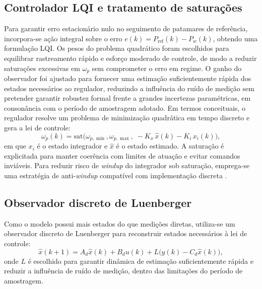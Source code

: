 \documentclass[a4paper]{ifacconf}
\begin{document}
\subsection{Controlador LQI e tratamento de saturações}
Para garantir erro estacionário nulo no seguimento de patamares de referência, incorpora-se ação integral sobre o erro $e(k)=P_{\mathrm{ref}}(k)-P_w(k)$, obtendo uma formulação LQI. Os pesos do problema quadrático foram escolhidos para equilibrar rastreamento rápido e esforço moderado de controle, de modo a reduzir saturações excessivas em $\omega_p$ sem comprometer o erro em regime. O ganho do observador foi ajustado para fornecer uma estimação suficientemente rápida dos estados necessários ao regulador, reduzindo a influência do ruído de medição sem pretender garantir robustez formal frente a grandes incertezas paramétricas, em consonância com o período de amostragem adotado. Em termos conceituais, o regulador resolve um problema de minimização quadrática em tempo discreto e gera a lei de controle:
\begin{equation}
   \omega_p(k) = \mathrm{sat}\big(\omega_{p,\min},\omega_{p,\max},\; -K_x\,\hat{x}(k)-K_i\,x_i(k)\big),
   \label{eq:lqi_control}
\end{equation}
em que $x_i$ é o estado integrador e $\hat{x}$ é o estado estimado. A saturação é explicitada para manter coerência com limites de atuação e evitar comandos inviáveis. Para reduzir risco de \textit{windup} do integrador sob saturação, emprega-se uma estratégia de anti-\textit{windup} compatível com implementação discreta \cite{FranklinPowellWorkman1998,Ogata1997}.

\subsection{Observador discreto de Luenberger}
Como o modelo possui mais estados do que medições diretas, utiliza-se um observador discreto de Luenberger para reconstruir estados necessários à lei de controle:
\begin{equation}
   \hat{x}(k+1)=A_d\hat{x}(k)+B_d u(k)+L\big(y(k)-C_d\hat{x}(k)\big),
   \label{eq:luenberger}
\end{equation}
onde $L$ é escolhido para garantir dinâmica de estimação suficientemente rápida e reduzir a influência de ruído de medição, dentro das limitações do período de amostragem.
\end{document}
